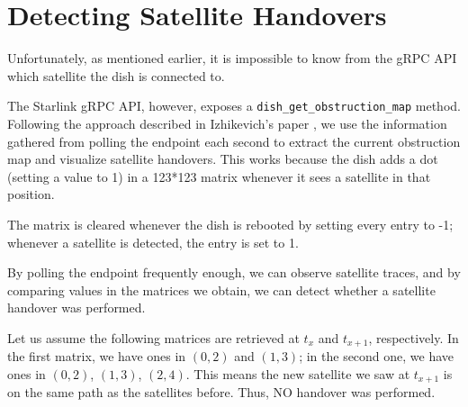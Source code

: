 \documentclass[]{report}
\begin{document}
\section{Detecting Satellite Handovers}

Unfortunately, as mentioned earlier, it is impossible to know from the gRPC API which satellite the dish is connected to.

The Starlink gRPC API, however, exposes a \texttt{dish\_get\_obstruction\_map} method. Following the approach described
in Izhikevich's paper \cite{izhikevich2023democratizing}, we use the information gathered from polling the endpoint each
second to extract the current obstruction map and visualize satellite handovers. This works because the dish adds a dot
(setting a value to 1) in a 123*123 matrix whenever it sees a satellite in that position. 

The matrix is cleared whenever the dish is rebooted by setting every entry to -1; whenever a satellite is detected, the
entry is set to 1. 

By polling the endpoint frequently enough, we can observe satellite traces, and by comparing values in the matrices we
obtain, we can detect whether a satellite handover was performed.

Let us assume the following matrices are retrieved at $ t_x $ and $ t_{x+1} $, respectively. 
In the first matrix, we have ones in $ (0,2) $ and $ (1,3) $; in the second one, we have ones in $ (0,2) $, $ (1,3) $, $
(2,4) $. This means the new satellite we saw at $ t_{x+1} $ is on the same path as the satellites before. Thus, NO
handover was performed. \vspace{10mm}
\end{document}
